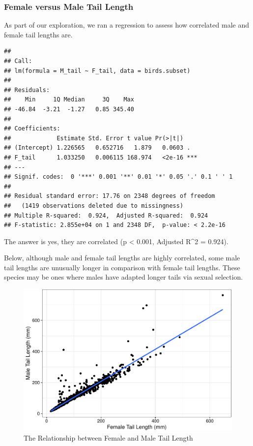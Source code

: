 \documentclass[
  12pt,
]{article}
\begin{document}
\hypertarget{female-versus-male-tail-length}{%
\subsubsection{Female versus Male Tail
Length}\label{female-versus-male-tail-length}}

As part of our exploration, we ran a regression to assess how correlated
male and female tail lengths are.

\begin{verbatim}
## 
## Call:
## lm(formula = M_tail ~ F_tail, data = birds.subset)
## 
## Residuals:
##    Min     1Q Median     3Q    Max 
## -46.84  -3.21  -1.27   0.85 345.40 
## 
## Coefficients:
##             Estimate Std. Error t value Pr(>|t|)    
## (Intercept) 1.226565   0.652716   1.879   0.0603 .  
## F_tail      1.033250   0.006115 168.974   <2e-16 ***
## ---
## Signif. codes:  0 '***' 0.001 '**' 0.01 '*' 0.05 '.' 0.1 ' ' 1
## 
## Residual standard error: 17.76 on 2348 degrees of freedom
##   (1419 observations deleted due to missingness)
## Multiple R-squared:  0.924,  Adjusted R-squared:  0.924 
## F-statistic: 2.855e+04 on 1 and 2348 DF,  p-value: < 2.2e-16
\end{verbatim}

The answer is yes, they are correlated (p \textless{} 0.001, Adjusted
R\^{}2 = 0.924).

\newpage

Below, although male and female tail lengths are highly correlated, some
male tail lengths are unusually longer in comparison with female tail
lengths. These species may be ones where males have adapted longer tails
via sexual selection.

\begin{figure}
\centering
\includegraphics{Project_Code_files/figure-latex/r exploratory_plots_3-1.pdf}
\caption{The Relationship between Female and Male Tail Length}
\end{figure}
\end{document}

